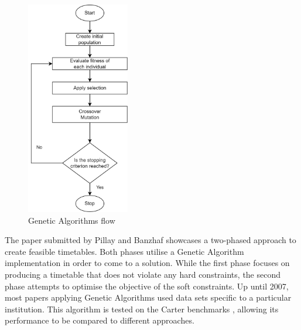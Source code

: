 \begin{figure}[H]
	\centering
	\includegraphics[width=0.40\textwidth]{images/related_works/GA/GA.png} 
	\caption{Genetic Algorithms flow}
	\label{fig:GA}
\end{figure}

The paper submitted by Pillay and Banzhaf \cite{pillay2010} showcases a two-phased approach to create feasible timetables. Both phases utilise a Genetic Algorithm implementation in order to come to a solution. While the first phase focuses on producing a timetable that does not violate any hard constraints, the second phase attempts to optimise the objective of the soft constraints. Up until 2007, most papers applying Genetic Algorithms used data sets specific to a particular institution. This algorithm is tested on the Carter benchmarks \cite{carter1996}, allowing its performance to be compared to different approaches.


